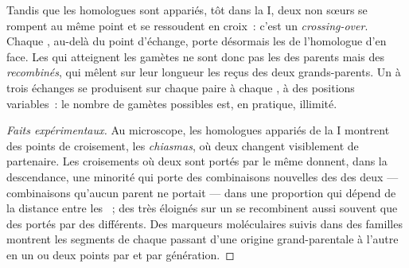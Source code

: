 \begin{proposition}\label{prop:g12:meiosis-genetic-shuffling:crossingover}
Tandis que les homologues sont appariés, tôt dans la  I, deux
 non sœurs se rompent au même point et se ressoudent en
croix~: c'est un \emph{crossing-over}. Chaque
, au-delà du point d'échange, porte désormais les  de
l'homologue d'en face. Les  qui atteignent les gamètes ne
sont donc pas les  des parents mais des 
\emph{recombinés}, qui mêlent sur leur longueur les  reçus des
deux grands-parents. Un à trois échanges se produisent sur chaque paire
à chaque , à des positions variables~: le nombre de gamètes
possibles est, en pratique, illimité.
\end{proposition}
\begin{proof}[Faits expérimentaux]
Au microscope, les homologues appariés de la  I montrent des
points de croisement, les \emph{chiasmas}, où deux  changent
visiblement de partenaire. Les croisements où deux  sont portés
par le même  donnent, dans la descendance, une minorité qui
porte des combinaisons nouvelles des  des deux  ---
combinaisons qu'aucun parent ne portait --- dans une proportion qui
dépend de la distance entre les ~; des  très éloignés sur un
 se recombinent aussi souvent que des  portés par des
 différents. Des marqueurs moléculaires suivis dans des
familles montrent les segments de chaque  passant d'une
origine grand-parentale à l'autre en un ou deux points par 
et par génération.
\end{proof}

